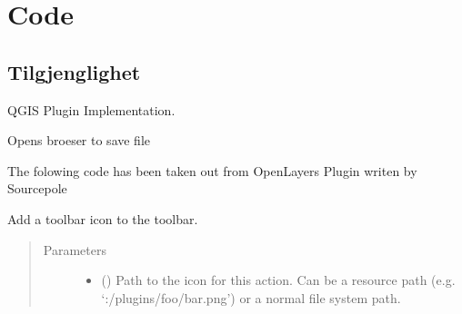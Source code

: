 \documentclass[letterpaper,10pt,english]{sphinxmanual}
\begin{document}
\chapter{Code}
\label{\detokenize{code:code}}\label{\detokenize{code::doc}}

\section{Tilgjenglighet}
\label{\detokenize{code:tilgjenglighet}}

\begin{fulllineitems}
\label{\detokenize{code:Tilgjengelighet.Tilgjengelighet}}
QGIS Plugin Implementation.

\begin{fulllineitems}
\label{\detokenize{code:Tilgjengelighet.Tilgjengelighet.OpenBrowser}}
Opens broeser to save file

\end{fulllineitems}


\begin{fulllineitems}
\label{\detokenize{code:Tilgjengelighet.Tilgjengelighet.addLayer}}
The folowing code has been taken out from OpenLayers Plugin writen by Sourcepole

\end{fulllineitems}


\begin{fulllineitems}
\label{\detokenize{code:Tilgjengelighet.Tilgjengelighet.add_action}}
Add a toolbar icon to the toolbar.
\begin{quote}\begin{description}
\item[{Parameters}] \leavevmode\begin{itemize}
\item {} 
 () \textendash{} Path to the icon for this action. Can be a resource
path (e.g. ‘:/plugins/foo/bar.png’) or a normal file system path.


\end{itemize}
\end{description}
\end{quote}
\end{fulllineitems}
\end{fulllineitems}
\end{document}
